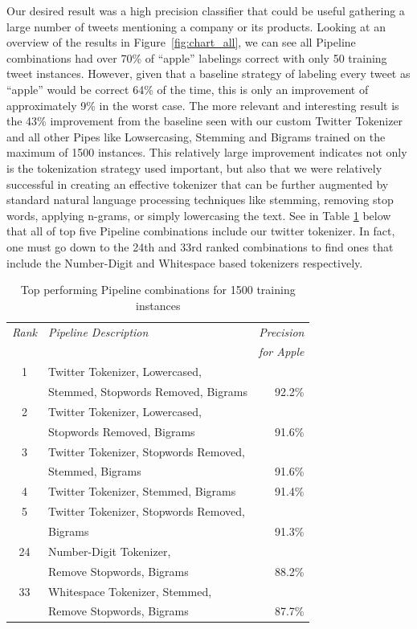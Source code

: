 \documentclass[letterpaper]{article}
\begin{document}
Our desired result was a high precision classifier that could be useful gathering a large number of tweets mentioning a company or its products. Looking at an overview of the results in Figure~\ref{fig:chart_all}, we can see all Pipeline combinations had over 70\% of ``apple'' labelings correct with only 50 training tweet instances. However, given that a baseline strategy of labeling every tweet as ``apple'' would be correct 64\% of the time, this is only an improvement of approximately 9\% in the worst case. The more relevant and interesting result is the 43\% improvement from the baseline seen with our custom Twitter Tokenizer and all other Pipes like Lowsercasing, Stemming and Bigrams trained on the maximum of 1500 instances. This relatively large improvement indicates not only is the tokenization strategy used important, but also that we were relatively successful in creating an effective tokenizer that can be further augmented by standard natural language processing techniques like stemming, removing stop words, applying n-grams, or simply lowercasing the text. See in Table \ref{tab:top_pipelines} below that all of top five Pipeline combinations include our twitter tokenizer. In fact, one must go down to the 24th and 33rd ranked combinations to find ones that include the Number-Digit and Whitespace based tokenizers respectively.

\begin{table}[h]
\centering
\small
\begin{tabular}{|c|l|r|}
	\hline
	\textit{Rank} & \textit{Pipeline Description} & \textit{Precision} \\
	& & \textit{for Apple} \\ \hline
	1 & Twitter Tokenizer, Lowercased, & \\ & Stemmed, Stopwords Removed, Bigrams & 92.2\% \\ \hline
	2 & Twitter Tokenizer, Lowercased, & \\ & Stopwords Removed, Bigrams & 91.6\% \\ \hline
	3 & Twitter Tokenizer, Stopwords Removed, & \\ & Stemmed, Bigrams & 91.6\% \\ \hline
	4 & Twitter Tokenizer, Stemmed, Bigrams & 91.4\% \\ \hline
	5 & Twitter Tokenizer, Stopwords Removed, & \\ & Bigrams & 91.3\% \\ \hline
	\hline
	24 & Number-Digit Tokenizer, & \\ & Remove Stopwords, Bigrams & 88.2\%
 \\ \hline
	\hline
	33 & Whitespace Tokenizer, Stemmed, & \\ & Remove Stopwords, Bigrams & 87.7\% \\ \hline

\end{tabular}
\caption{Top performing Pipeline combinations for 1500 training instances}
\label{tab:top_pipelines}
\end{table}
\end{document}
